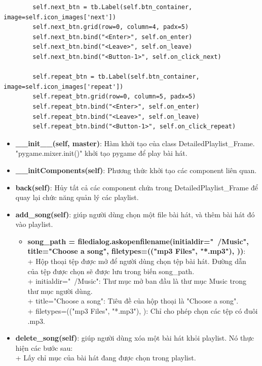 \documentclass[a4paper]{article}
\begin{document}
\begin{mdframed}[hidealllines=true,backgroundcolor=magenta!10]
\begin{lstlisting}
        self.next_btn = tb.Label(self.btn_container, image=self.icon_images['next'])
        self.next_btn.grid(row=0, column=4, padx=5)
        self.next_btn.bind("<Enter>", self.on_enter)
        self.next_btn.bind("<Leave>", self.on_leave)
        self.next_btn.bind("<Button-1>", self.on_click_next)

        self.repeat_btn = tb.Label(self.btn_container, image=self.icon_images['repeat'])
        self.repeat_btn.grid(row=0, column=5, padx=5)
        self.repeat_btn.bind("<Enter>", self.on_enter)
        self.repeat_btn.bind("<Leave>", self.on_leave)
        self.repeat_btn.bind("<Button-1>", self.on_click_repeat)
\end{lstlisting}
\end{mdframed}

\begin{itemize}
    \item \textbf{\_\_init\_\_(self, master)}: Hàm khởi tạo của class DetailedPlaylist\_Frame. "pygame.mixer.init()" khởi tạo pygame để play bài hát. 
    \item \textbf{\_\_initComponents(self)}: Phương thức khởi tạo các component liên quan.
    \item \textbf{back(self)}: Hủy tất cả các component chứa trong DetailedPlaylist\_Frame để quay lại chức năng quản lý các playlist.
    \item \textbf{add\_song(self)}: giúp người dùng chọn một file bài hát, và thêm bài hát đó vào playlist.
    \begin{itemize}
        \item \textbf{song\_path = filedialog.askopenfilename(initialdir="~/Music", title="Choose a song", filetypes=(("mp3 Files", "*.mp3"), ))}: \\
        + Hộp thoại tệp được mở để người dùng chọn tệp bài hát. Đường dẫn của tệp được chọn sẽ được lưu trong biến song\_path. \\
        + initialdir="~/Music": Thư mục mở ban đầu là thư mục Music trong thư mục người dùng. \\
        + title="Choose a song": Tiêu đề của hộp thoại là "Choose a song". \\
        + filetypes=(("mp3 Files", "*.mp3"), ): Chỉ cho phép chọn các tệp có đuôi .mp3.
    \end{itemize}
    \item \textbf{delete\_song(self)}: giúp người dùng xóa một bài hát khỏi playlist. Nó thực hiện các bước sau: \\
    + Lấy chỉ mục của bài hát đang được chọn trong playlist. \\

\end{itemize}
\end{document}
